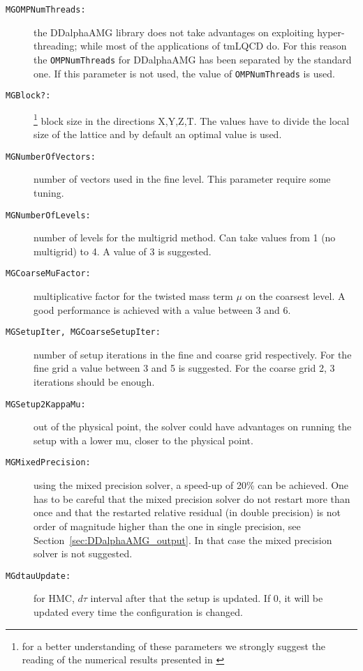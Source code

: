 \begin{description}
	\item[\texttt{MGOMPNumThreads:}] the DDalphaAMG library does not take advantages on exploiting hyper-threading; while most of the applications of tmLQCD do. For this reason the \texttt{OMPNumThreads} for DDalphaAMG has been separated by the standard one. If this parameter is not used, the value of \texttt{OMPNumThreads} is used.
	\item[\texttt{MGBlock?:}]\footnote{\label{fn:Alexandrou:2016izb} for a better understanding of these parameters we strongly suggest the reading of the numerical results presented in \cite{Alexandrou:2016izb}} block size in the directions X,Y,Z,T. The values have to divide the local size of the lattice and by default an optimal value is used.
	\item[\texttt{MGNumberOfVectors:}] number of vectors used in the fine level. This parameter require some tuning.
	\item[\texttt{MGNumberOfLevels:}] number of levels for the multigrid method. Can take values from 1 (no multigrid) to 4. A value of 3 is suggested.
	\item[\texttt{MGCoarseMuFactor:}] multiplicative factor for the twisted mass term $\mu$ on the coarsest level. A good performance is achieved with a value between 3 and 6.
	\item[\texttt{MGSetupIter, MGCoarseSetupIter:}] number of setup iterations in the fine and coarse grid respectively. For the fine grid a value between 3 and 5 is suggested. For the coarse grid 2, 3 iterations should be enough. 
	\item[\texttt{MGSetup2KappaMu:}] out of the physical point, the
          solver could have advantages on running the setup with a
          lower mu, closer to the physical point.
	\item[\texttt{MGMixedPrecision:}] using the mixed precision solver,
          a speed-up of 20\% can be achieved. One has to be careful
          that the mixed precision solver do not restart more than
          once and that the restarted relative residual (in double
          precision) is not order of magnitude higher than the one in single
          precision, see Section~\ref{sec:DDalphaAMG_output}. In that
          case the mixed precision solver is not suggested.
	\item[\texttt{MGdtauUpdate:}] for HMC, $d\tau$ interval after that the setup is updated. If 0, it will be updated every time the configuration is changed.

\end{description}
